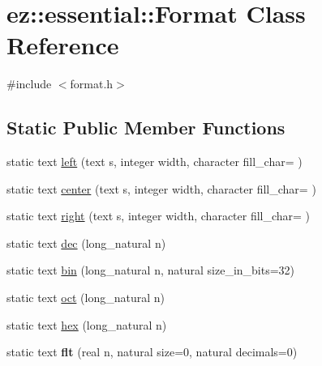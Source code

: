 \hypertarget{classez_1_1essential_1_1Format}{}\section{ez\+:\+:essential\+:\+:Format Class Reference}
\label{classez_1_1essential_1_1Format}


{\ttfamily \#include $<$format.\+h$>$}

\subsection*{Static Public Member Functions}
\begin{DoxyCompactItemize}
\item 
static text \hyperlink{classez_1_1essential_1_1Format_ad77d7f94ad041e3905107c391dbcd00a}{left} (text s, integer width, character fill\+\_\+char=\textquotesingle{} \textquotesingle{})
\item 
static text \hyperlink{classez_1_1essential_1_1Format_aad619b944b2ab388ccb82b1d82ef610b}{center} (text s, integer width, character fill\+\_\+char=\textquotesingle{} \textquotesingle{})
\item 
static text \hyperlink{classez_1_1essential_1_1Format_a46180d9a7dd6202fb5225b1fe83f50bb}{right} (text s, integer width, character fill\+\_\+char=\textquotesingle{} \textquotesingle{})
\item 
static text \hyperlink{classez_1_1essential_1_1Format_ab163df0d05d66c0402c46ecfae2dee82}{dec} (long\+\_\+natural n)
\item 
static text \hyperlink{classez_1_1essential_1_1Format_a9fe91dede9e02e992d4ab410d89a0e21}{bin} (long\+\_\+natural n, natural size\+\_\+in\+\_\+bits=32)
\item 
static text \hyperlink{classez_1_1essential_1_1Format_ac5e90b9408d5ff10bbdf4cc0d4f55895}{oct} (long\+\_\+natural n)
\item 
static text \hyperlink{classez_1_1essential_1_1Format_aa61095f58c70d7a4dfcb1e555fd3673d}{hex} (long\+\_\+natural n)
\item 
\mbox{\label{classez_1_1essential_1_1Format_a3afc25d1fc2e5085caaa56f64b6747b5}} 
static text {\bfseries flt} (real n, natural size=0, natural decimals=0)
\end{DoxyCompactItemize}
